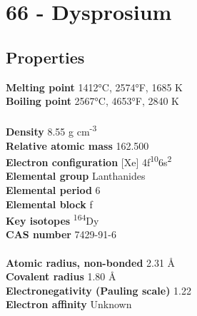 \section{66 - Dysprosium}
\label{sec:elem-dysprosium}
\subsection{Properties}
\textbf{Melting point} 1412°C, 2574°F, 1685 K\\
\textbf{Boiling point} 2567°C, 4653°F, 2840 K\\
\\
\textbf{Density} 8.55 g cm\textsuperscript{-3}\\
\textbf{Relative atomic mass} 162.500\\
\textbf{Electron configuration} [Xe] 4f\textsuperscript{10}6s\textsuperscript{2}\\
\textbf{Elemental group} Lanthanides\\
\textbf{Elemental period} 6\\
\textbf{Elemental block} f\\
\textbf{Key isotopes} \textsuperscript{164}Dy\\
\textbf{CAS number} 7429-91-6\\
\\
\textbf{Atomic radius, non-bonded} 2.31 Å\\
\textbf{Covalent radius} 1.80 Å\\
\textbf{Electronegativity (Pauling scale)} 1.22\\
\textbf{Electron affinity} Unknown\\